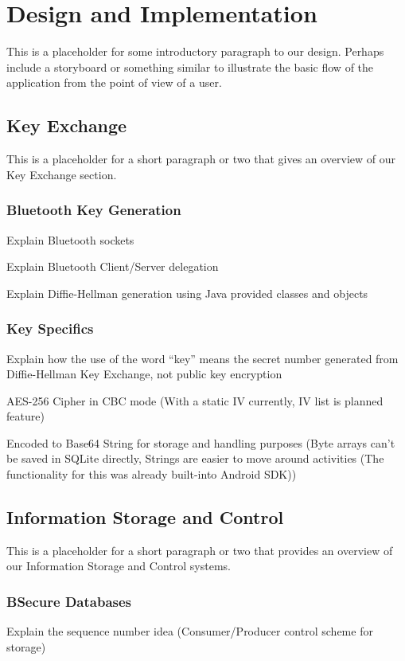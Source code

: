 \section{Design and Implementation}
This is a placeholder for some introductory paragraph to our design. Perhaps include a storyboard or something similar to illustrate the basic flow of the application
from the point of view of a user.

\subsection{Key Exchange}
This is a placeholder for a short paragraph or two that gives an overview of our Key Exchange section.

\subsubsection{Bluetooth Key Generation}
Explain Bluetooth sockets

Explain Bluetooth Client/Server delegation

Explain Diffie-Hellman generation using Java provided classes and objects

\subsubsection{Key Specifics}
Explain how the use of the word ``key'' means the secret number generated from Diffie-Hellman Key Exchange, not public key encryption

AES-256 Cipher in CBC mode (With a static IV currently, IV list is planned feature)

Encoded to Base64 String for storage and handling purposes (Byte arrays can't be saved in SQLite directly, Strings are easier to move around activities (The functionality for this was already built-into Android SDK))

\subsection{Information Storage and Control}
This is a placeholder for a short paragraph or two that provides an overview of our Information Storage and Control systems.

\subsubsection{BSecure Databases}
Explain the sequence number idea (Consumer/Producer control scheme for storage)


